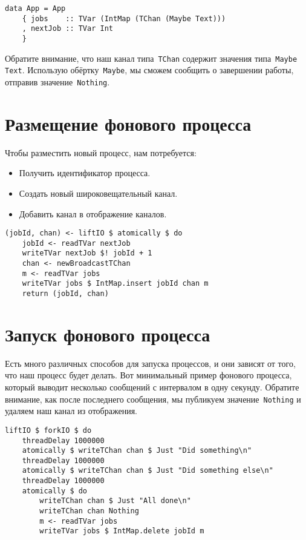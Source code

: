 \begin{lstlisting}
data App = App
    { jobs    :: TVar (IntMap (TChan (Maybe Text)))
    , nextJob :: TVar Int
    }
\end{lstlisting}

Обратите внимание, что наш канал типа~\lstinline'TChan' содержит значения
типа~\lstinline'Maybe Text'. Использую обёртку~\lstinline'Maybe', мы сможем
сообщить о завершении работы, отправив значение~\lstinline'Nothing'.

\section{Размещение фонового процесса}
Чтобы разместить новый процесс, нам потребуется:
\begin{itemize}
    \item Получить идентификатор процесса.

    \item Создать новый широковещательный канал.

    \item Добавить канал в отображение каналов.
\end{itemize}

\begin{lstlisting}
(jobId, chan) <- liftIO $ atomically $ do
    jobId <- readTVar nextJob
    writeTVar nextJob $! jobId + 1
    chan <- newBroadcastTChan
    m <- readTVar jobs
    writeTVar jobs $ IntMap.insert jobId chan m
    return (jobId, chan)
\end{lstlisting}

\section{Запуск фонового процесса}

Есть много различных способов для запуска процессов, и они зависят от того, что
наш процесс будет делать. Вот минимальный пример фонового процесса, который
выводит несколько сообщений с интервалом в одну секунду. Обратите внимание, как
после последнего сообщения, мы публикуем значение~\lstinline'Nothing' и удаляем
наш канал из отображения.

\begin{lstlisting}
liftIO $ forkIO $ do
    threadDelay 1000000
    atomically $ writeTChan chan $ Just "Did something\n"
    threadDelay 1000000
    atomically $ writeTChan chan $ Just "Did something else\n"
    threadDelay 1000000
    atomically $ do
        writeTChan chan $ Just "All done\n"
        writeTChan chan Nothing
        m <- readTVar jobs
        writeTVar jobs $ IntMap.delete jobId m
\end{lstlisting}

